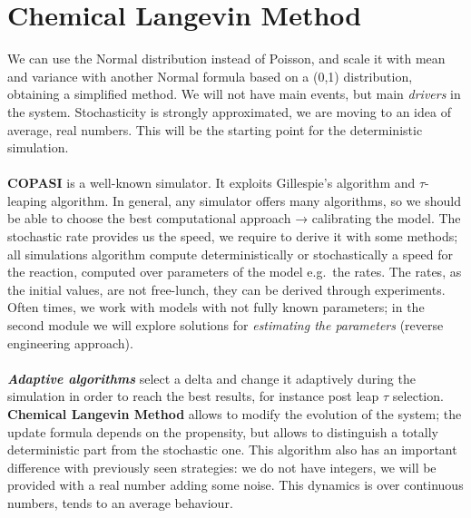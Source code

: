   









\section{Chemical Langevin Method}
We can use the Normal distribution instead of Poisson, and scale it with mean and variance with another Normal formula based on a (0,1) distribution, obtaining a simplified method.
We will not have main events, but main \emph{drivers} in the system.
Stochasticity is strongly approximated, we are moving to an idea of average, real numbers.
This will be the starting point for the deterministic simulation.
\\
\\
\noindent
\textbf{COPASI} is a well-known simulator.
It exploits Gillespie's algorithm and $\tau$-leaping algorithm.
In general, any simulator offers many algorithms, so we should be able to choose the best computational approach → calibrating the model.
The stochastic rate provides us the speed, we require to derive it with some methods; all simulations algorithm compute deterministically or stochastically a speed for the reaction, computed over parameters of the model e.g.~the rates.
The rates, as the initial values, are not free-lunch, they can be derived through experiments.
Often times, we work with models with not fully known parameters; in the second module we will explore solutions for \emph{estimating the parameters} (reverse engineering approach).
\\
\\
\noindent
\textbf{\emph{Adaptive algorithms}} select a delta and change it adaptively during the simulation in order to reach the best results, for instance post leap $\tau$ selection.
\textbf{Chemical Langevin Method} allows to modify the evolution of the system; the update formula depends on the propensity, but allows to distinguish a totally deterministic part from the stochastic one.
This algorithm also has an important difference with previously seen strategies: we do not have integers, we will be provided with a real number adding some noise.
This dynamics is over continuous numbers, tends to an average behaviour.
